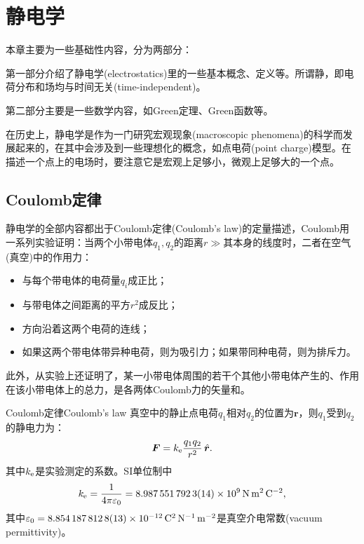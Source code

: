 \chapter{静电学}
\label{chap:electrostatics}

本章主要为一些基础性内容，分为两部分：
\begin{compactenum}
    \item 第一部分介绍了静电学(electrostatics)里的一些基本概念、定义等。所谓静，即电荷分布和场均与时间无关(time-independent)。
    \item 第二部分主要是一些数学内容，如Green定理、Green函数等。
\end{compactenum}
在历史上，静电学是作为一门研究宏观现象(macroscopic phenomena)的科学而发展起来的，在其中会涉及到一些理想化的概念，如点电荷(point charge)模型。在描述一个点上的电场时，要注意它是宏观上足够小，微观上足够大的一个点。

\section{Coulomb定律}

静电学的全部内容都出于Coulomb定律(Coulomb's law)的定量描述，Coulomb用一系列实验证明：当两个小带电体$q_1,q_2$的距离$r \gg$其本身的线度时，二者在空气(真空)中的作用力：
\begin{itemize}
    \item 与每个带电体的电荷量$q_i$成正比；
    \item 与带电体之间距离的平方$r^2$成反比；
    \item 方向沿着这两个电荷的连线；
    \item 如果这两个带电体带异种电荷，则为吸引力；如果带同种电荷，则为排斥力。
\end{itemize}
此外，从实验上还证明了，某一小带电体周围的若干个其他小带电体产生的、作用在该小带电体上的总力，是各两体Coulomb力的矢量和。

\begin{theorem}{Coulomb定律}{Coulomb's law}
    真空中的静止点电荷$q_1$相对$q_2$的位置为$\bm r$，则$q_1$受到$q_2$的静电力为：
    \begin{equation}
        \label{eqn:Coulomb law}
        \bm F = k_\mathrm e\frac{q_1q_2}{r^2}\mathop{}\!\hat{\bm{r}}.
    \end{equation}
    其中$k_\mathrm e$是实验测定的系数。SI单位制中
    \begin{equation}
        \label{eq:ed-coulomb-constant}
        k_\mathrm e = \frac1{4\pi\varepsilon_0} = \qty{8.9875517923(14)E9}{\newton\metre\squared\per\coulomb\squared},
    \end{equation}
    其中$\varepsilon_0 = \qty{8.8541878128(13)E-12}{\coulomb\squared\per\newton\per\metre\squared}$是真空介电常数(vacuum permittivity)。
\end{theorem}

